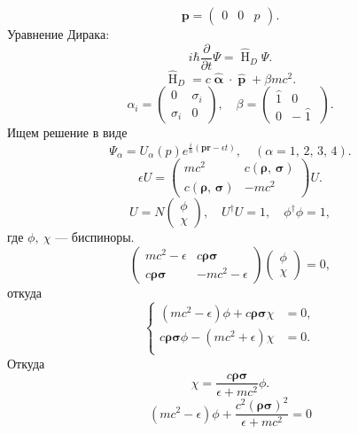 \documentclass[a4paper]{article}
\begin{document}
\begin{hiProb}[6]
\end{hiProb}
\begin{sol}
\[
	\mathbf{p}= \begin{pmatrix} 0 & 0 & p \end{pmatrix} 
.\] 
Уравнение Дирака:
\[
i \hbar \frac{\partial }{\partial t} \Psi= \widehat{\operatorname{H}}_D \Psi
.\] 
\[
\widehat{\operatorname{H}}_D= c \widehat{\operatorname{\boldsymbol{\alpha }}}
\cdot \widehat{\operatorname{\mathbf{p}}}+\beta mc^2
.\] 
\[
	\alpha_i = \begin{pmatrix} 0 & \sigma_i \\
	\sigma_i &0\end{pmatrix} ,\quad \beta=
		\begin{pmatrix} \widehat{\operatorname{1}}& 0\\
		0 & -\widehat{\operatorname{1}}\end{pmatrix} 
.\] 
Ищем решение в виде
\[
	\Psi_\alpha= U_\alpha (p) e^{\frac{i}{\hbar }
	\left( \mathbf{p} \mathbf{r} -\epsilon t \right) },\quad
	(\alpha=1,\,2,\,3,\,4)
.\] 
\[
	\epsilon  U= \begin{pmatrix} mc^2 & c
	\left( \boldsymbol{\rho},\,\boldsymbol{\sigma}\right)\\
c \left( \boldsymbol{\rho},\,\boldsymbol{\sigma} \right) &
-mc^2 \end{pmatrix} U
.\] 
\[
U= N \begin{pmatrix} \phi\\ \chi \end{pmatrix} ,\quad
U^\dagger U=1,\quad \phi^\dagger \phi=1
,\]
где $\phi,\ \chi$ --- биспиноры.
\[
	\begin{pmatrix} mc^2-\epsilon  & c \boldsymbol{\rho}
	\boldsymbol{\sigma}\\ c \boldsymbol{\rho}\boldsymbol{\sigma} & -mc^2 -\epsilon \end{pmatrix} \begin{pmatrix} \phi\\\chi \end{pmatrix} =0
,\]
откуда
\[
\left\{
\begin{aligned}
	(mc^2 -\epsilon ) \phi+ c \boldsymbol{\rho}\boldsymbol{\sigma}\chi&= 0, \\
	c \boldsymbol{\rho}\boldsymbol{\sigma} \phi-
	(mc^2 +\epsilon ) \chi&= 0. \\
\end{aligned}
\right.
\] 
Откуда
\[
\chi= \frac{c \boldsymbol{\rho \boldsymbol{\sigma}}}{\epsilon +mc^2}\phi
.\] 
\[
	(mc^2-\epsilon ) \phi + \frac{c^2 (\boldsymbol{\rho}\boldsymbol{\sigma})^2}{\epsilon +mc^2}=0
\]
\end{sol}
\end{document}
